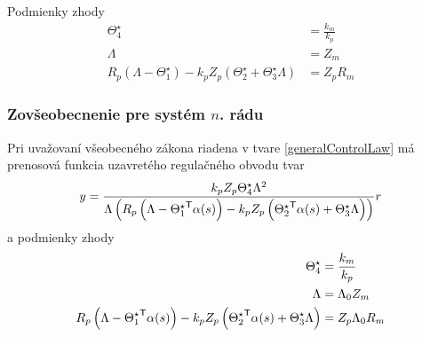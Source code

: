 \documentclass[a4paper, 10pt, ]{article}
\begin{document}
Podmienky zhody
\begin{subequations}
	\begin{align}
		\Theta_4^\star &= \frac{k_m}{k_p} \label{idealTheta4_02} \\
		\Lambda &= Z_m  \label{lambda_02}\\
		R_p \left( \Lambda - \Theta_1^\star \right) - k_p Z_p \left( \Theta_2^\star + \Theta_3^\star\Lambda \right)
		&=
		Z_p R_m
	\end{align}
\end{subequations}


















\subsubsection{Zovšeobecnenie pre systém $n$. rádu}


Pri uvažovaní všeobecného zákona riadena v tvare \eqref{generalControlLaw} má prenosová funkcia uzavretého regulačného obvodu tvar
\begin{equation}
	y
	=
	\frac{
		k_p
		Z_p
		\Theta_4^\star
		\Lambda^2
		}{
		\Lambda
		\left(
			R_p
			\left(
				\Lambda - {\Theta_1^\star}^{\mathsf{T}}	\alpha(s)
			\right)
			-
			k_p
			Z_p
			\left(
				{\Theta_2^\star}^{\mathsf{T}}	\alpha(s)
				+
				\Theta_3^\star \Lambda
			\right)
		\right)}
	r
\end{equation}
a podmienky zhody
\begin{subequations}
	\begin{align}
		\Theta_4^\star &= \frac{k_m}{k_p} \label{idealTheta4_03} \\
		\Lambda &= \Lambda_0 Z_m \label{lambda_03} \\
		R_p
		\left(
			\Lambda - {\Theta_1^\star}^{\mathsf{T}} \alpha(s)
		\right)
		-
		k_p
		Z_p
		\left(
			{\Theta_2^\star}^{\mathsf{T}} \alpha(s)
			+
			\Theta_3^\star \Lambda
		\right)
	    &=
	    Z_p
	    \Lambda_0
	    R_m
	\end{align}
\end{subequations}
\end{document}
